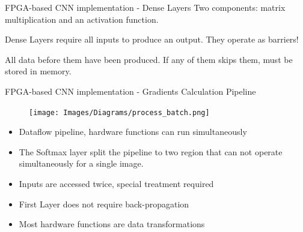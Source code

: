 


\begin{frame}{FPGA-based CNN implementation - Dense Layers}
    Two components: matrix multiplication and an activation function.

    Dense Layers require all inputs to produce an output. They operate as barriers!
    
    All data before them have been produced. If any of them skips them, must be stored in memory.
\end{frame}

\begin{frame}{FPGA-based CNN implementation - Gradients Calculation Pipeline}
	\begin{minipage}{0.25\textwidth}
    	\begin{figure}[H]
            \centering
    		\texttt{[image: Images/Diagrams/process\_batch.png]}
    	\end{figure}%
	\end{minipage}%
	\begin{minipage}{0.75\textwidth}
    	\begin{itemize}
    	    \item Dataflow pipeline, hardware functions can run simultaneously
        	\item The Softmax layer split the pipeline to two region that can not operate simultaneously for a single image.
        	\item Inputs are accessed twice, special treatment required
        	\item First Layer does not require back-propagation
        	\item Most hardware functions are data transformations
    	\end{itemize}
	\end{minipage}%
\end{frame}

